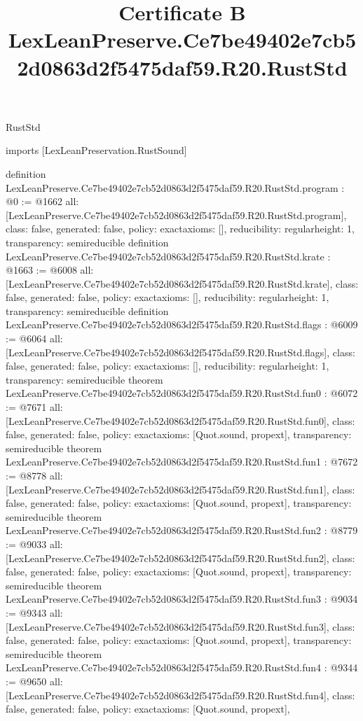 \begin{lexlean}{RustStd}
\title{Certificate B LexLeanPreserve.Ce7be49402e7cb52d0863d2f5475daf59.R20.RustStd}
\begin{coremodule}
imports [LexLeanPreservation.RustSound]

definition LexLeanPreserve.Ce7be49402e7cb52d0863d2f5475daf59.R20.RustStd.program : @0 := @1662 {
  all: [LexLeanPreserve.Ce7be49402e7cb52d0863d2f5475daf59.R20.RustStd.program],
  class: false,
  generated: false,
  policy: exact{axioms: []},
  reducibility: regular{height: 1},
  transparency: semireducible
}
definition LexLeanPreserve.Ce7be49402e7cb52d0863d2f5475daf59.R20.RustStd.krate : @1663 := @6008 {
  all: [LexLeanPreserve.Ce7be49402e7cb52d0863d2f5475daf59.R20.RustStd.krate],
  class: false,
  generated: false,
  policy: exact{axioms: []},
  reducibility: regular{height: 1},
  transparency: semireducible
}
definition LexLeanPreserve.Ce7be49402e7cb52d0863d2f5475daf59.R20.RustStd.flags : @6009 := @6064 {
  all: [LexLeanPreserve.Ce7be49402e7cb52d0863d2f5475daf59.R20.RustStd.flags],
  class: false,
  generated: false,
  policy: exact{axioms: []},
  reducibility: regular{height: 1},
  transparency: semireducible
}
theorem LexLeanPreserve.Ce7be49402e7cb52d0863d2f5475daf59.R20.RustStd.fun0 : @6072 := @7671 {
  all: [LexLeanPreserve.Ce7be49402e7cb52d0863d2f5475daf59.R20.RustStd.fun0],
  class: false,
  generated: false,
  policy: exact{axioms: [Quot.sound, propext]},
  transparency: semireducible
}
theorem LexLeanPreserve.Ce7be49402e7cb52d0863d2f5475daf59.R20.RustStd.fun1 : @7672 := @8778 {
  all: [LexLeanPreserve.Ce7be49402e7cb52d0863d2f5475daf59.R20.RustStd.fun1],
  class: false,
  generated: false,
  policy: exact{axioms: [Quot.sound, propext]},
  transparency: semireducible
}
theorem LexLeanPreserve.Ce7be49402e7cb52d0863d2f5475daf59.R20.RustStd.fun2 : @8779 := @9033 {
  all: [LexLeanPreserve.Ce7be49402e7cb52d0863d2f5475daf59.R20.RustStd.fun2],
  class: false,
  generated: false,
  policy: exact{axioms: [Quot.sound, propext]},
  transparency: semireducible
}
theorem LexLeanPreserve.Ce7be49402e7cb52d0863d2f5475daf59.R20.RustStd.fun3 : @9034 := @9343 {
  all: [LexLeanPreserve.Ce7be49402e7cb52d0863d2f5475daf59.R20.RustStd.fun3],
  class: false,
  generated: false,
  policy: exact{axioms: [Quot.sound, propext]},
  transparency: semireducible
}
theorem LexLeanPreserve.Ce7be49402e7cb52d0863d2f5475daf59.R20.RustStd.fun4 : @9344 := @9650 {
  all: [LexLeanPreserve.Ce7be49402e7cb52d0863d2f5475daf59.R20.RustStd.fun4],
  class: false,
  generated: false,
  policy: exact{axioms: [Quot.sound, propext]},
}
\end{coremodule}
\end{lexlean}
